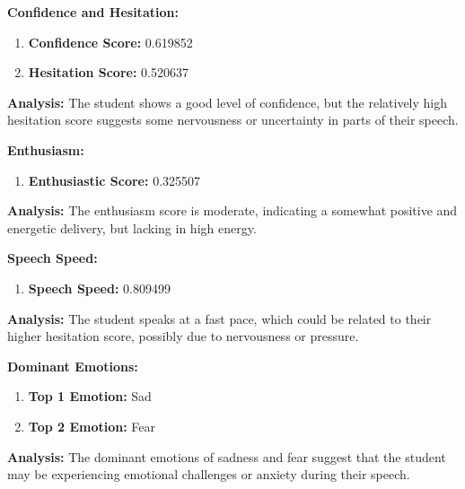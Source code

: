 \documentclass{article}
\begin{document}
\large{\textbf{Confidence and Hesitation:}}
\begin{tcolorbox}[colback=green!10!white, colframe=green!80!black, title=Confidence and Hesitation Scores]
    \begin{enumerate}
        \item \textbf{Confidence Score:} \textcolor{green!50!black}{0.619852}
        \item \textbf{Hesitation Score:} \textcolor{red!70!black}{0.520637}
    \end{enumerate}
\end{tcolorbox}
    \textbf{Analysis:} The student shows a good level of confidence, but the relatively high hesitation score suggests some nervousness or uncertainty in parts of their speech.

\large{\textbf{Enthusiasm:}}
\begin{tcolorbox}[colback=orange!10!white, colframe=orange!80!black, title=Enthusiastic Score]
    \begin{enumerate}
        \item \textbf{Enthusiastic Score:} \textcolor{orange!70!black}{0.325507}
    \end{enumerate}
\end{tcolorbox}
    \textbf{Analysis:} The enthusiasm score is moderate, indicating a somewhat positive and energetic delivery, but lacking in high energy.

\large{\textbf{Speech Speed:}}
\begin{tcolorbox}[colback=purple!10!white, colframe=purple!80!black, title=Speech Speed]
    \begin{enumerate}
        \item \textbf{Speech Speed:} \textcolor{purple!70!black}{0.809499}
    \end{enumerate}
\end{tcolorbox}
    \textbf{Analysis:} The student speaks at a fast pace, which could be related to their higher hesitation score, possibly due to nervousness or pressure.

\large{\textbf{Dominant Emotions:}}
\begin{tcolorbox}[colback=pink!10!white, colframe=pink!80!black, title=Emotional State]
    \begin{enumerate}
        \item \textbf{Top 1 Emotion:} \textcolor{blue!80!black}{Sad}
        \item \textbf{Top 2 Emotion:} \textcolor{red!80!black}{Fear}
    \end{enumerate}
\end{tcolorbox}
    \textbf{Analysis:} The dominant emotions of sadness and fear suggest that the student may be experiencing emotional challenges or anxiety during their speech.
\end{document}
